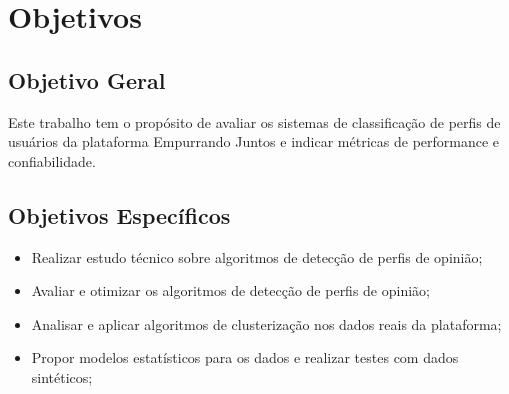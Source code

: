 \section{Objetivos}

\subsection{Objetivo Geral}

Este trabalho tem o propósito de avaliar os sistemas de classificação de perfis de usuários da plataforma Empurrando Juntos e indicar métricas de performance e confiabilidade.


\subsection{Objetivos Específicos}

\begin{itemize}
	\item Realizar estudo técnico sobre algoritmos de detecção de perfis de opinião;
	\item Avaliar e otimizar os algoritmos de detecção de perfis de opinião;
	\item Analisar e aplicar algoritmos de clusterização nos dados reais da plataforma;
	\item Propor modelos estatísticos para os dados e realizar testes com dados sintéticos;
	
\end{itemize}

